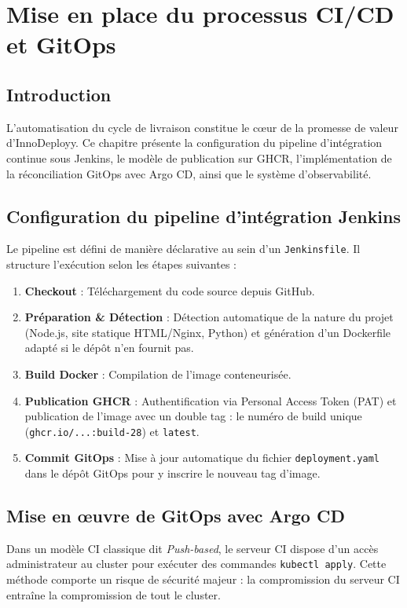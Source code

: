 \documentclass[12pt,a4paper,oneside]{report}
\begin{document}
\chapter{Mise en place du processus CI/CD et GitOps}

\section{Introduction}
L'automatisation du cycle de livraison constitue le cœur de la promesse de valeur d'InnoDeployy. Ce chapitre présente la configuration du pipeline d'intégration continue sous Jenkins, le modèle de publication sur GHCR, l'implémentation de la réconciliation GitOps avec Argo CD, ainsi que le système d'observabilité.

\section{Configuration du pipeline d'intégration Jenkins}
Le pipeline est défini de manière déclarative au sein d'un \texttt{Jenkinsfile}. Il structure l'exécution selon les étapes suivantes :
\begin{enumerate}
    \item \textbf{Checkout} : Téléchargement du code source depuis GitHub.
    \item \textbf{Préparation & Détection} : Détection automatique de la nature du projet (Node.js, site statique HTML/Nginx, Python) et génération d'un Dockerfile adapté si le dépôt n'en fournit pas.
    \item \textbf{Build Docker} : Compilation de l'image conteneurisée.
    \item \textbf{Publication GHCR} : Authentification via Personal Access Token (PAT) et publication de l'image avec un double tag : le numéro de build unique (\texttt{ghcr.io/...:build-28}) et \texttt{latest}.
    \item \textbf{Commit GitOps} : Mise à jour automatique du fichier \texttt{deployment.yaml} dans le dépôt GitOps pour y inscrire le nouveau tag d'image.
\end{enumerate}

\section{Mise en œuvre de GitOps avec Argo CD}
Dans un modèle CI classique dit \textit{Push-based}, le serveur CI dispose d'un accès administrateur au cluster pour exécuter des commandes \texttt{kubectl apply}. Cette méthode comporte un risque de sécurité majeur : la compromission du serveur CI entraîne la compromission de tout le cluster.
\end{document}
